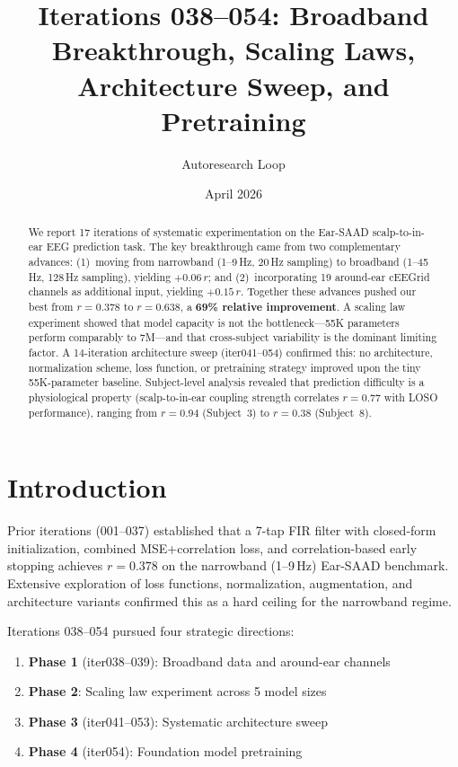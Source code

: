 \documentclass[11pt,a4paper]{article}
\title{Iterations 038--054: Broadband Breakthrough, Scaling Laws,\\
  Architecture Sweep, and Pretraining}
\author{Autoresearch Loop}
\date{April 2026}
\begin{document}
\maketitle

\begin{abstract}
We report 17 iterations of systematic experimentation on the Ear-SAAD
scalp-to-in-ear EEG prediction task. The key breakthrough came from two
complementary advances: (1)~moving from narrowband (1--9\,Hz, 20\,Hz sampling)
to broadband (1--45\,Hz, 128\,Hz sampling), yielding $+0.06\,r$; and
(2)~incorporating 19 around-ear cEEGrid channels as additional input,
yielding $+0.15\,r$. Together these advances pushed our best from
$r=0.378$ to $r=0.638$, a \textbf{69\% relative improvement}. A scaling
law experiment showed that model capacity is not the bottleneck---55K
parameters perform comparably to 7M---and that cross-subject variability
is the dominant limiting factor. A 14-iteration architecture sweep
(iter041--054) confirmed this: no architecture, normalization scheme,
loss function, or pretraining strategy improved upon the tiny 55K-parameter
baseline. Subject-level analysis revealed that prediction difficulty is
a physiological property (scalp-to-in-ear coupling strength correlates
$r=0.77$ with LOSO performance), ranging from $r=0.94$ (Subject~3) to
$r=0.38$ (Subject~8).
\end{abstract}

\tableofcontents
\newpage

\section{Introduction}

Prior iterations (001--037) established that a 7-tap FIR filter with
closed-form initialization, combined MSE+correlation loss, and
correlation-based early stopping achieves $r=0.378$ on the narrowband
(1--9\,Hz) Ear-SAAD benchmark. Extensive exploration of loss functions,
normalization, augmentation, and architecture variants confirmed this as a
hard ceiling for the narrowband regime.

Iterations 038--054 pursued four strategic directions:
\begin{enumerate}
  \item \textbf{Phase 1} (iter038--039): Broadband data and around-ear channels
  \item \textbf{Phase 2}: Scaling law experiment across 5 model sizes
  \item \textbf{Phase 3} (iter041--053): Systematic architecture sweep
  \item \textbf{Phase 4} (iter054): Foundation model pretraining
\end{enumerate}
\end{document}
